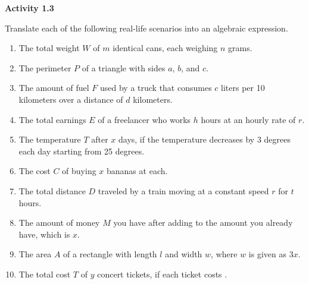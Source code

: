 \vspace{1ex}
\noindent\textbf{Activity 1.3}

\vspace{0.75ex}

Translate each of the following real-life scenarios into an algebraic expression. 
\begin{enumerate}

    \item The total weight \( W \) of \( m \) identical cans, each weighing \( n \) grams.
    \item The perimeter \( P \) of a triangle with sides \( a \), \( b \), and \( c \).
    \item The amount of fuel \( F \) used by a truck that consumes \( c \) liters per 10 kilometers over a distance of \( d \) kilometers.
    \item The total earnings \( E \) of a freelancer who works \( h \) hours at an hourly rate of \( r \).
    \item The temperature \( T \) after \( x \) days, if the temperature decreases by 3 degrees each day starting from 25 degrees.
        \item The cost \( C \) of buying \( x \) bananas at  each.
    \item The total distance \( D \) traveled by a train moving at a constant speed \( r \) for \( t \) hours.
    \item The amount of money \( M \) you have after adding  to the amount you already have, which is \( x \).
    \item The area \( A \) of a rectangle with length \( l \) and width \( w \), where \( w \) is given as \( 3x \).
    \item The total cost \( T \) of \( y \) concert tickets, if each ticket costs .
\end{enumerate}
